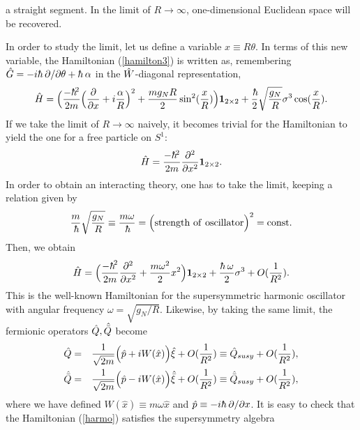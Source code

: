 \documentclass[a4paper,12pt]{article}
\begin{document}
a straight segment. In the limit of $R\rightarrow \infty$, one-dimensional 
Euclidean space will be recovered.\par
In order to study the limit, let us define a variable $x\equiv R\theta$.
In terms of this new variable, the Hamiltonian (\ref{hamilton3}) is written 
as, remembering $\hg=-i\hbar~\del/\del\theta +\hbar~\alpha$ in the 
$\hat W$-diagonal representation, 
\begin{equation}  
\hat H= \Bigl({-\hbar^2\over {2m}}\Bigl({\del\over {\del x}}
+i{\alpha\over R}\Bigr)^2
+{{mg_NR}\over 2}\sin^2({x\over R})\Bigr){\bf 1}_{2\times 2} 
+{\hbar\over 2}\sqrt{{g_N\over R}}\sigma^3\cos({x\over R}).
\label{hamilton4} 
\end{equation}
If we take the limit of $R\rightarrow\infty$ naively, it becomes trivial for 
the Hamiltonian to yield the one for a free particle on $S^1$:
\begin{equation}
{\hat H}={-\hbar^2\over {2m}}{\del^2\over {\del x^2}}{\bf 1}_{2\times 2}.
\end{equation} 
In order to obtain an interacting theory, one has to take the limit, keeping 
a relation given by
\begin{equation}
{m\over \hbar}\sqrt{g_N\over R}\equiv 
{{m\omega}\over \hbar}=\Bigl({\rm strength~of~oscillator} \Bigr)^2
={\rm const}.
\label{relation}
\end{equation}
Then, we obtain 
\begin{equation}  
\hat H = \Bigl({-{\hbar}^2\over{2m}}{\del^2\over {\del x^2}}
+{{m\omega^2}\over 2} x^2\Bigr){\bf 1}_{2\times 2} 
+{{\hbar~\omega}\over 2}\sigma^3 + O({1\over R^2}).
\label{harmo} 
\end{equation}
This is the well-known Hamiltonian for the supersymmetric harmonic 
oscillator \cite{witten} with angular frequency $\omega=\sqrt{g_N/R}$.
Likewise, by taking the same limit, the fermionic operators $\hat Q, \hat{\bar Q}$
become
\begin{eqnarray}
\hat Q&=&{1\over {\sqrt {2m}}}\Bigl({\hat p} + i W({\hat x})\Bigr)\hat\xi
+O({1\over R^2})\equiv \hat Q_{susy}+O({1\over R^2}),\nonumber\\
\hat{\bar Q}&=&{1\over {\sqrt{2m}}}\Bigl({\hat p} - i W({\hat x})\Bigr)\hat{\bar\xi}
+O({1\over R^2})\equiv\hat{\bar Q}_{susy}+O({1\over R^2}),
\label{super2}
\end{eqnarray}
where we have defined $W({\hat x})\equiv m{\omega} {\hat x}$ and 
${\hat p}\equiv -i{\hbar}~\del/\del x$. It is easy to check that 
the Hamiltonian (\ref{harmo}) satisfies the supersymmetry algebra
\end{document}
